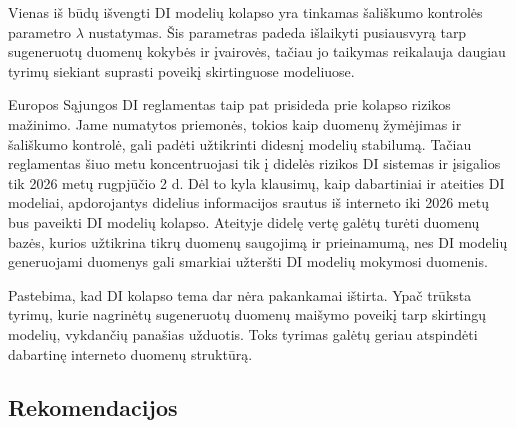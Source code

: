 \documentclass{VUMIFInfKursinis}
\begin{document}
Vienas iš būdų išvengti DI modelių kolapso yra tinkamas šališkumo kontrolės parametro \(\lambda\) nustatymas. Šis parametras padeda išlaikyti pusiausvyrą tarp sugeneruotų duomenų kokybės ir įvairovės, tačiau jo taikymas reikalauja daugiau tyrimų siekiant suprasti poveikį skirtinguose modeliuose.

Europos Sąjungos DI reglamentas taip pat prisideda prie kolapso rizikos mažinimo. Jame numatytos priemonės, tokios kaip duomenų žymėjimas ir šališkumo kontrolė, gali padėti užtikrinti didesnį modelių stabilumą. Tačiau reglamentas šiuo metu koncentruojasi tik į didelės rizikos DI sistemas ir įsigalios tik 2026 metų rugpjūčio 2 d. Dėl to kyla klausimų, kaip dabartiniai ir ateities DI modeliai, apdorojantys didelius informacijos srautus iš interneto iki 2026 metų bus paveikti DI modelių kolapso. Ateityje didelę vertę galėtų turėti duomenų bazės, kurios užtikrina tikrų duomenų saugojimą ir prieinamumą, nes DI modelių generuojami duomenys gali smarkiai užteršti DI modelių mokymosi duomenis.

Pastebima, kad DI kolapso tema dar nėra pakankamai ištirta. Ypač trūksta tyrimų, kurie nagrinėtų sugeneruotų duomenų maišymo poveikį tarp skirtingų modelių, vykdančių panašias užduotis. Toks tyrimas galėtų geriau atspindėti dabartinę interneto duomenų struktūrą. 



\subsection{Rekomendacijos}
\end{document}
